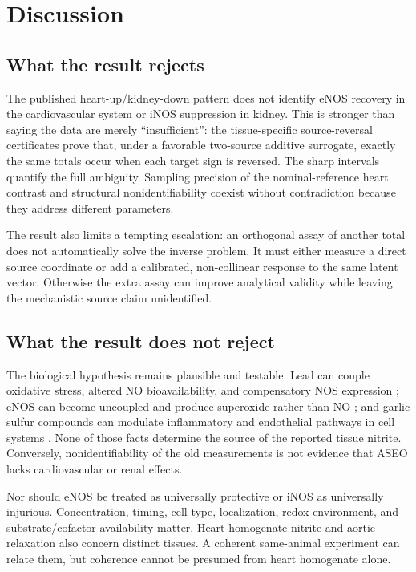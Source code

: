 \documentclass[11pt]{article}
\begin{document}
\section{Discussion}

\subsection{What the result rejects}

The published heart-up/kidney-down pattern does not identify eNOS recovery in the cardiovascular system or iNOS suppression in kidney. This is stronger than saying the data are merely ``insufficient'': the tissue-specific source-reversal certificates prove that, under a favorable two-source additive surrogate, exactly the same totals occur when each target sign is reversed. The sharp intervals quantify the full ambiguity. Sampling precision of the nominal-reference heart contrast and structural nonidentifiability coexist without contradiction because they address different parameters.

The result also limits a tempting escalation: an orthogonal assay of another total does not automatically solve the inverse problem. It must either measure a direct source coordinate or add a calibrated, non-collinear response to the same latent vector. Otherwise the extra assay can improve analytical validity while leaving the mechanistic source claim unidentified.

\subsection{What the result does not reject}

The biological hypothesis remains plausible and testable. Lead can couple oxidative stress, altered NO bioavailability, and compensatory NOS expression \citep{vaziri1999,vaziri2001,silveira2014}; eNOS can become uncoupled and produce superoxide rather than NO \citep{landmesser2003}; and garlic sulfur compounds can modulate inflammatory and endothelial pathways in cell systems \citep{kim2001,lei2010}. None of those facts determine the source of the reported tissue nitrite. Conversely, nonidentifiability of the old measurements is not evidence that ASEO lacks cardiovascular or renal effects.

Nor should eNOS be treated as universally protective or iNOS as universally injurious. Concentration, timing, cell type, localization, redox environment, and substrate/cofactor availability matter. Heart-homogenate nitrite and aortic relaxation also concern distinct tissues. A coherent same-animal experiment can relate them, but coherence cannot be presumed from heart homogenate alone.
\end{document}

